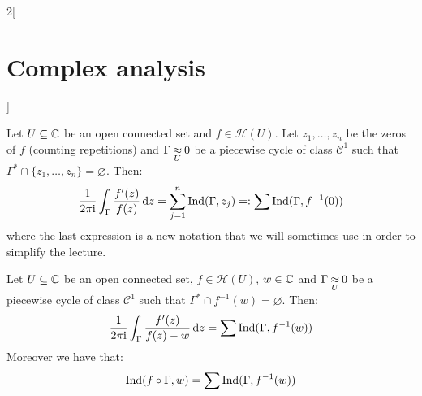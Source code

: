 \documentclass[../../../main_math.tex]{subfiles}
\begin{document}
\begin{multicols}{2}[\section{Complex analysis}]
  \begin{theorem}
    Let $U\subseteq\mathbb{C}$ be an open connected set and $f\in\mathcal{H}(U)$. Let $z_1,\ldots,z_n$ be the zeros of $f$ (counting repetitions) and $\Gamma\mathbin{\underset{U}{\approx}} 0$ be a piecewise cycle of class $\mathcal{C}^1$ such that $\Gamma^*\cap\{z_1,\ldots,z_n\}=\varnothing$. Then:
    $$\frac{1}{2\pi\mathrm{i}}\int_{\Gamma}\frac{f'(z)}{f(z)}\dd{z}=\sum_{j=1}^n\operatorname{Ind}(\Gamma,z_j)=:\sum\operatorname{Ind}(\Gamma,f^{-1}(0))$$
    where the last expression is a new notation that we will sometimes use in order to simplify the lecture.
  \end{theorem}
  \begin{corollary}
    Let $U\subseteq\mathbb{C}$ be an open connected set, $f\in\mathcal{H}(U)$, $w\in \mathbb{C}$ and $\Gamma\mathbin{\underset{U}{\approx}} 0$ be a piecewise cycle of class $\mathcal{C}^1$ such that $\Gamma^*\cap f^{-1}(w)=\varnothing$. Then:
    $$\frac{1}{2\pi\mathrm{i}}\int_{\Gamma}\frac{f'(z)}{f(z)-w}\dd{z}=\sum\operatorname{Ind}(\Gamma,f^{-1}(w))$$
    Moreover we have that:
    $$\operatorname{Ind}(f\circ\Gamma,w)=\sum\operatorname{Ind}(\Gamma,f^{-1}(w))$$
  \end{corollary}

\end{multicols}
\end{document}
